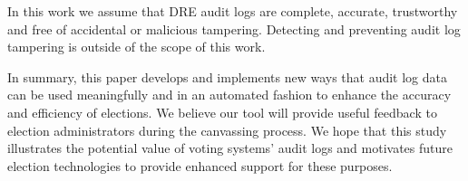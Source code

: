 In this work we assume that DRE audit logs are complete, accurate,  trustworthy and free of accidental or malicious tampering. Detecting and preventing audit log tampering is outside of the scope of this work.

In summary, this paper develops and implements new ways that audit log data can be used meaningfully and in an automated fashion to enhance the accuracy and efficiency of elections. We believe our tool will provide useful feedback to election administrators during the canvassing process. We hope that this study illustrates the potential value of voting systems' audit logs and motivates future election technologies to provide enhanced support for these purposes.

